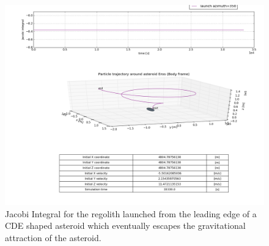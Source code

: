 \begin{figure}[htb]
\centering
\captionsetup{justification=centering}
\includegraphics[width=\textwidth, height=0.6\textheight]{Images/jacobi_test_for_escaped_particle.png}
\caption{Jacobi Integral for the regolith launched from the leading edge of a \gls{CDE} shaped asteroid which eventually escapes the gravitational attraction of the asteroid.}
\label{fig:cde_asteroid_jacobi_escape_vv}
\end{figure}
\FloatBarrier

